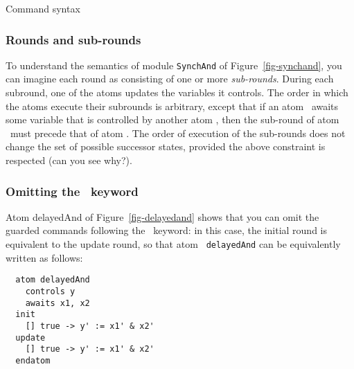 \begin{table}\boxed{\begin{tabbing}
\command\ \gramdef\ \= \FORALL\ $\vari$ $\var$\nextop\LSQBRAC$\vari$\RSQBRAC\ \ASSIGN\ \expr\\[1ex]
                    \> $|$ $\var$\nextop[\aassign] \ASSIGN\ \expr\ $|$ \NONDET \\[1ex]
                    \> $|$ \eventvar \EXCLAMATION\\[3ex]
\expr\ \gramdef\ \boolexpr\ $|$ \numexpr\ $|$ \bitexpr \\[3ex]
$\var$ \gramdef\ \ident\ \qquad $\vari$ \gramdef\ \ident
\end{tabbing}}
\caption{Command syntax}
\label{table-command-syntax}
\end{table}


\subsubsection{Rounds and sub-rounds}

To understand the semantics of module {\tt SynchAnd} of
Figure~\ref{fig-synchand}, you can imagine each round as consisting of
one or more {\em sub-rounds}. During each subround,
one of the atoms updates the variables it controls.  The order in
which the atoms execute their subrounds is arbitrary, except that if
an atom \atom\ awaits some variable that is controlled by another atom
\aatom, then the sub-round of atom \atom\ must precede that of atom
\aatom.  The order of execution of the sub-rounds does not change the
set of possible successor states, provided the above constraint is
respected (can you see why?).


\subsubsection{Omitting the \INIT\
keyword}

Atom delayedAnd of Figure~\ref{fig-delayedand} shows that you can omit
the guarded commands following the \INIT\ keyword: in this case, the
initial round is equivalent to the update round, so that atom {\tt
delayedAnd} can be equivalently written as follows: 

\begin{verbatim}
  atom delayedAnd
    controls y
    awaits x1, x2
  init
    [] true -> y' := x1' & x2'
  update 
    [] true -> y' := x1' & x2'
  endatom
\end{verbatim}


